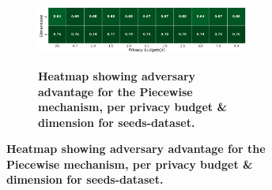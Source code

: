 \begin{figure}[H]
\begin{subfigure}[b]{0.85\textwidth}
        \begin{subfigure}[c]{1\textwidth}
            \caption{\textbf{Heatmap showing adversary advantage for the Piecewise mechanism, per privacy budget \& dimension for seeds-dataset.}}
            \includegraphics[width=1\textwidth]{Results/kd-laplace/piecewise/skewed-dataset/shokri_mi_adv.png}
            \label{fig:privacy_skewed-dataset_adversial_advantage_piecewise}
        \end{subfigure}
    \end{subfigure}
    \hfill %
    \begin{subfigure}[b]{0.075\textwidth}

\end{subfigure}
\end{figure}
